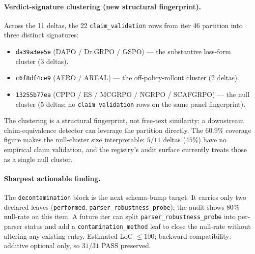 \documentclass{article}
\begin{document}
\paragraph{Verdict-signature clustering (new structural fingerprint).}
Across the 11 deltas, the 22 \texttt{claim\_validation} rows from
iter 46 partition into three distinct signatures:
\begin{itemize}
\item \texttt{da39a3ee5e} (DAPO / Dr.GRPO / GSPO) --- the substantive
loss-form cluster (3 deltas).
\item \texttt{c6f8df4ce9} (AERO / AREAL) --- the off-policy-rollout
cluster (2 deltas).
\item \texttt{13255b77ea} (CPPO / ES / MCGRPO / NGRPO / SCAFGRPO) ---
the null cluster (5 deltas; no \texttt{claim\_validation} rows on the
same panel fingerprint).
\end{itemize}
The clustering is a structural fingerprint, not free-text similarity:
a downstream claim-equivalence detector can leverage the partition
directly. The 60.9\% coverage figure makes the null-cluster size
interpretable: $5/11$ deltas ($45\%$) have no empirical claim
validation, and the registry's audit surface currently treats those as
a single null cluster.

\paragraph{Sharpest actionable finding.}
The \texttt{decontamination} block is the next schema-bump target.
It carries only two declared leaves (\texttt{performed},
\texttt{parser\_robustness\_probe}); the audit shows $80\%$ null-rate
on this item. A future iter can split
\texttt{parser\_robustness\_probe} into per-parser status and add a
\texttt{contamination\_method} leaf to close the null-rate without
altering any existing entry. Estimated LoC $\leq 100$;
backward-compatibility: additive optional only, so $31/31$ PASS
preserved.
\end{document}
